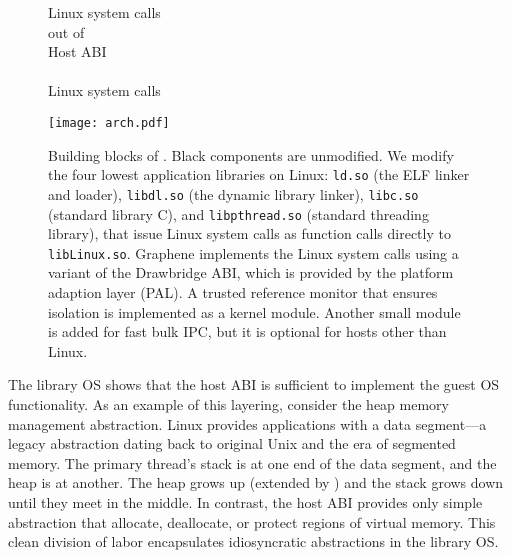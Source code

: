 \begin{figure}[t]
\centering
\begin{minipage}[b]{1.25in}
\footnotesize
\raggedleft
Linux system calls \\
\graphenesyscallnum{} out of \linuxsyscallnum{}\\
\vspace{0.1in}
Host ABI \\
\palcallnum{} \hostapis{}\\
\vspace{0.2in}
\hostsyscallnum{} Linux system calls
\vspace{0.35in}
\end{minipage}
\hspace{-1.25in}
\texttt{[image: arch.pdf]}
\caption{Building blocks of \graphene{}.  Black components are unmodified.
We modify the four lowest application libraries on Linux:
{\tt ld.so} (the ELF linker and loader),
{\tt libdl.so} (the dynamic library linker),
{\tt libc.so} (standard library C),
and {\tt libpthread.so} (standard threading library), that issue Linux system calls as function calls directly to {\tt libLinux.so}.
Graphene implements the Linux system calls using a variant of the Drawbridge ABI, which is provided by the platform adaption layer (PAL).
A trusted reference monitor that ensures \libos{} isolation is implemented as a kernel module. Another small module is added for fast bulk IPC, but it is optional for hosts other than Linux.}
\label{fig:overview:arch}
\end{figure}


The library OS shows that the host ABI is sufficient to implement the guest OS functionality.
As an example of this layering, consider the heap memory management abstraction. Linux provides applications with a data segment---a legacy abstraction dating back to original Unix and the era of segmented memory. The primary thread's stack is at one end of the data segment, and the heap is at another.  The heap grows up (extended by ) and the stack grows down until they meet in the middle.
In contrast, the host ABI provides only simple abstraction that allocate, deallocate, or protect regions of virtual memory.
This clean division of labor encapsulates idiosyncratic abstractions
in the library OS.



